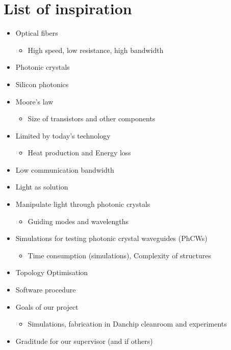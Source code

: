 \newpage
\section{List of inspiration}
\begin{itemize}
    \item Optical fibers
        \begin{itemize}
            \item High speed, low resistance, high bandwidth
        \end{itemize}
    
    \item Photonic crystals
    \item Silicon photonics
    \item Moore's law
        \begin{itemize}
            \item Size of transistors and other components
        \end{itemize}
    
    \item Limited by today's technology
        \begin{itemize}
            \item Heat production and Energy loss 
        \end{itemize}
    
    \item Low communication bandwidth
    \item Light as solution
    \item Manipulate light through photonic crystals
        \begin{itemize}
            \item Guiding modes and wavelengths
        \end{itemize}
    
    \item Simulations for testing photonic crystal waveguides (PhCWs)
        \begin{itemize}
            \item Time consumption (simulations), Complexity of structures
        \end{itemize}
    
    \item Topology Optimisation
    \item Software procedure
    \item Goals of our project
        \begin{itemize}
            \item Simulations, fabrication in Danchip cleanroom and experiments
        \end{itemize}
    
    \item Graditude for our supervisor (and if others)
\end{itemize}
